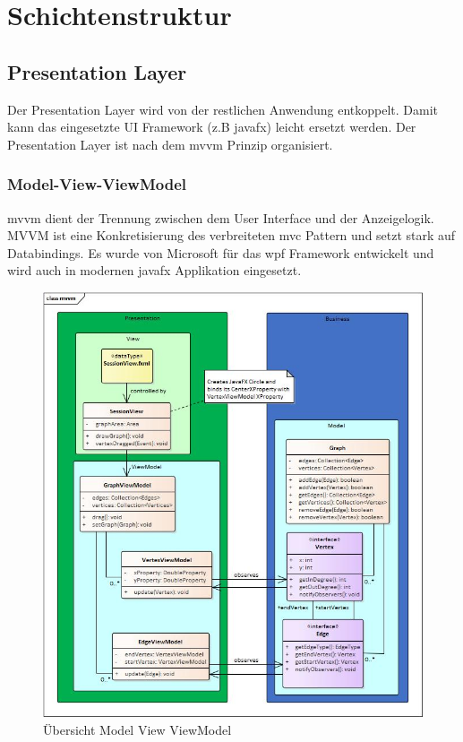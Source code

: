 \documentclass[11pt,a4paper,english,oneside]{book}
\numberwithin{equation}{chapter}
\begin{document}
	\clearpage
	
	\section{Schichtenstruktur} \label{ssec:layer-architecture}
	
	\subsection{Presentation Layer}
	Der Presentation Layer wird von der restlichen Anwendung entkoppelt. Damit kann das eingesetzte UI Framework (z.B \gls{javafx}) leicht ersetzt werden. Der Presentation Layer ist nach dem \gls{mvvm} Prinzip organisiert.
	
	\subsubsection{Model-View-ViewModel} \label{sssec:mvvm}
	\gls{mvvm} dient der Trennung zwischen dem User Interface und der Anzeigelogik. MVVM ist eine Konkretisierung des verbreiteten \gls{mvc} Pattern und setzt stark auf Databindings. Es wurde von Microsoft für das \gls{wpf} Framework entwickelt und wird auch in modernen \gls{javafx} Applikation eingesetzt.
	
	\begin{figure}[h!]
		\centering
		\includegraphics[width=0.7\linewidth]{assets/images/mvvm_concept}
		\caption[MVVM Konzept]{Übersicht Model View ViewModel}
		\label{fig:mvvmconcept}
	\end{figure}
	
\end{document}
